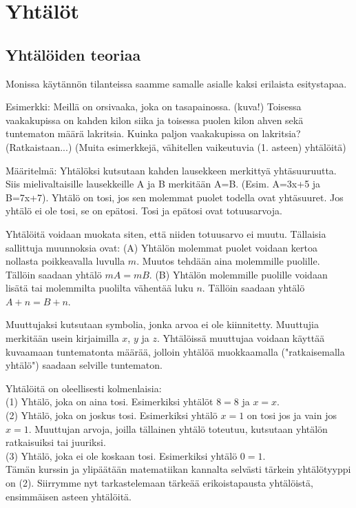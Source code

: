 %
\part{Yhtälöt}
\chapter{Yhtälöiden teoriaa}
Monissa käytännön tilanteissa saamme samalle asialle kaksi erilaista esitystapaa.

Esimerkki: Meillä on orsivaaka, joka on tasapainossa. (kuva!) Toisessa vaakakupissa on kahden kilon siika ja toisessa puolen kilon ahven sekä tuntematon määrä lakritsia. Kuinka paljon vaakakupissa on lakritsia? (Ratkaistaan...) (Muita esimerkkejä, vähitellen vaikeutuvia (1. asteen) yhtälöitä)

Määritelmä: Yhtälöksi kutsutaan kahden lausekkeen merkittyä yhtäsuuruutta. Siis mielivaltaisille lausekkeille A ja B merkitään A=B. (Esim. A=3x+5 ja B=7x+7). Yhtälö on tosi, jos sen molemmat puolet todella ovat yhtäsuuret. Jos yhtälö ei ole tosi, se on epätosi. Tosi ja epätosi ovat totuusarvoja.

Yhtälöitä voidaan muokata siten, että niiden totuusarvo ei muutu. Tällaisia sallittuja muunnoksia ovat:
(A) Yhtälön molemmat puolet voidaan kertoa nollasta poikkeavalla luvulla $m$. Muutos tehdään aina molemmille puolille. Tällöin saadaan yhtälö $mA = mB$.
(B) Yhtälön molemmille puolille voidaan lisätä tai molemmilta puolilta vähentää luku $n$. Tällöin saadaan yhtälö $A+n = B+n$.

Muuttujaksi kutsutaan symbolia, jonka arvoa ei ole kiinnitetty. Muuttujia merkitään usein kirjaimilla $x$, $y$ ja $z$. Yhtälöissä muuttujaa voidaan käyttää kuvaamaan tuntematonta määrää, jolloin yhtälöä muokkaamalla ("ratkaisemalla yhtälö") saadaan selville tuntematon.

Yhtälöitä on oleellisesti kolmenlaisia: \\
(1) Yhtälö, joka on aina tosi. Esimerkiksi yhtälöt $8=8$ ja $x=x$. \\
(2) Yhtälö, joka on joskus tosi. Esimerkiksi yhtälö $x=1$ on tosi jos ja vain jos $x=1$. Muuttujan arvoja, joilla tällainen yhtälö toteutuu, kutsutaan yhtälön ratkaisuiksi tai juuriksi. \\
(3) Yhtälö, joka ei ole koskaan tosi. Esimerkiksi yhtälö $0=1$. \\
Tämän kurssin ja ylipäätään matematiikan kannalta selvästi tärkein yhtälötyyppi on (2). Siirrymme nyt tarkastelemaan tärkeää erikoistapausta yhtälöistä, ensimmäisen asteen yhtälöitä.

